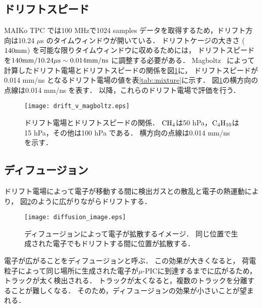 \documentclass[../master]{subfiles}
\begin{document}
\subsection{ドリフトスピード}
MAIKo TPC では100 MHzで1024 samples データを取得するため，ドリフト方向は10.24 $\mu$s のタイムウィンドウが開いている．
ドリフトケージの大きさ ($140\rm{mm}$) を可能な限りタイムウィンドウに収めるためには，
ドリフトスピードを$140\rm{mm}/10.24\rm{\mu s} \sim 0.014\rm{mm/ns}$ に調整する必要がある．
Magboltz~\cite{magboltz} によって計算したドリフト電場とドリフトスピードの関係を図\ref{fig::drift_v_magboltz}に，
ドリフトスピードが0.014 mm/ns となるドリフト電場の値を表\ref{tab::mixture}に示す．
図\ref{fig::drift_v_magboltz}の横方向の点線は0.014 mm/ns を表す．
以降，これらのドリフト電場で評価を行う．
\begin{figure}
  \centering
  \texttt{[image: drift\_v\_magboltz.eps]}
  \caption[ドリフト電場とドリフトスピードの関係．]
          {ドリフト電場とドリフトスピードの関係．
            ${\rm CH_{4}}$は50 hPa，${\rm C_{4}H_{10}}$は15 hPa，その他は100 hPa である．
          横方向の点線は0.014 mm/ns を示す．}
  \label{fig::drift_v_magboltz}
\end{figure}

\subsection{ディフュージョン}
ドリフト電場によって電子が移動する間に検出ガスとの散乱と電子の熱運動により，
図\ref{fig::diffusion-image}のように広がりながらドリフトする．
\begin{figure}
  \centering
  \texttt{[image: diffusion\_image.eps]}
  \caption[ディフュージョンによって電子が拡散するイメージ．]
          {ディフュージョンによって電子が拡散するイメージ．
          同じ位置で生成された電子でもドリフトする間に位置が拡散する．}
  \label{fig::diffusion-image}
\end{figure}
電子が広がることをディフュージョンと呼ぶ．
この効果が大きくなると，
荷電粒子によって同じ場所に生成された電子が$\mu$-PICに到達するまでに広がるため，
トラックが太く検出される．
トラックが太くなると，複数のトラックを分離することが難しくなる．
そのため，ディフュージョンの効果が小さいことが望まれる．
\end{document}
